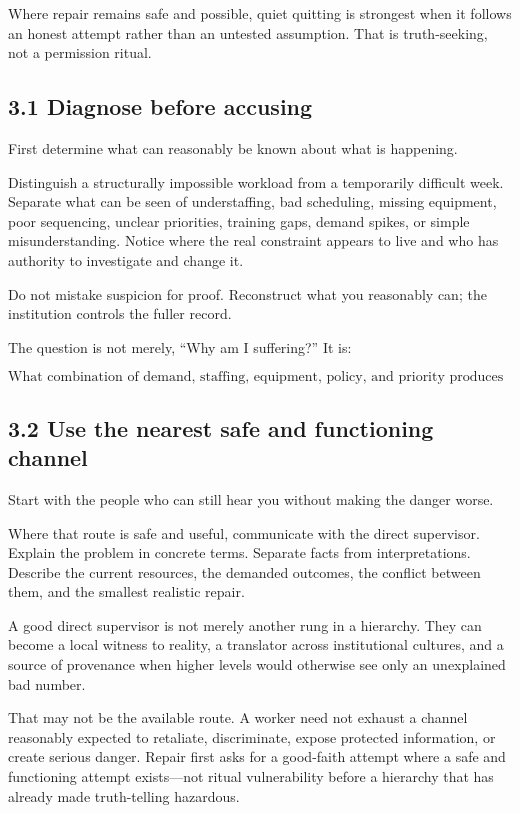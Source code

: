 \documentclass[11pt,oneside]{article}
\begin{document}
Where repair remains safe and possible, quiet quitting is strongest when
it follows an honest attempt rather than an untested assumption. That is
truth-seeking, not a permission ritual.

\hypertarget{diagnose-before-accusing}{%
\subsection{3.1 Diagnose before
accusing}\label{diagnose-before-accusing}}

First determine what can reasonably be known about what is happening.

Distinguish a structurally impossible workload from a temporarily
difficult week. Separate what can be seen of understaffing, bad
scheduling, missing equipment, poor sequencing, unclear priorities,
training gaps, demand spikes, or simple misunderstanding. Notice where
the real constraint appears to live and who has authority to investigate
and change it.

Do not mistake suspicion for proof. Reconstruct what you reasonably can;
the institution controls the fuller record.

The question is not merely, ``Why am I suffering?'' It is:

\[
\text{What combination of demand, staffing, equipment, policy, and priority produces this outcome?}
\]

\hypertarget{use-the-nearest-safe-and-functioning-channel}{%
\subsection{3.2 Use the nearest safe and functioning
channel}\label{use-the-nearest-safe-and-functioning-channel}}

Start with the people who can still hear you without making the danger
worse.

Where that route is safe and useful, communicate with the direct
supervisor. Explain the problem in concrete terms. Separate facts from
interpretations. Describe the current resources, the demanded outcomes,
the conflict between them, and the smallest realistic repair.

A good direct supervisor is not merely another rung in a hierarchy. They
can become a local witness to reality, a translator across institutional
cultures, and a source of provenance when higher levels would otherwise
see only an unexplained bad number.

That may not be the available route. A worker need not exhaust a channel
reasonably expected to retaliate, discriminate, expose protected
information, or create serious danger. Repair first asks for a
good-faith attempt where a safe and functioning attempt exists---not
ritual vulnerability before a hierarchy that has already made
truth-telling hazardous.
\end{document}
